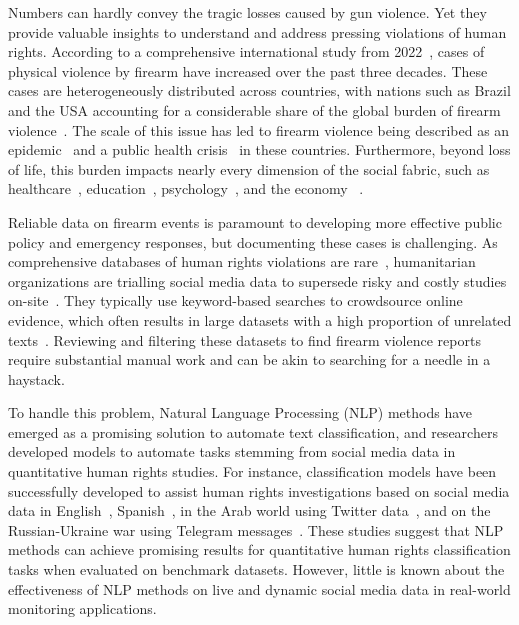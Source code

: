 \documentclass[11pt,letterpaper]{article}
\begin{document}
Numbers can hardly convey the tragic losses caused by gun violence. Yet they provide valuable insights to understand and address pressing violations of human rights. According to a comprehensive international study from 2022~\citep{ouGlobalBurdenTrends2022}, cases of physical violence by firearm have increased over the past three decades. These cases are heterogeneously distributed across countries, with nations such as Brazil and the USA accounting for a considerable share of the global burden of firearm violence~\citep{globalBurden2018,ouGlobalBurdenTrends2022}. The scale of this issue has led to firearm violence being described as an epidemic~\citep{szwarcwaldMortalidadePorArmas1998,kalesanHiddenEpidemicFirearm2017,cavalcantiDinamicasViolenciaUrbana2017,fontanarosaUnrelentingEpidemicFirearm2022} and a public health crisis~\citep{ezeImpactGunViolence2023,silverExaminingHealthcareEconomic2023,generalFirearmViolenceAmerica2024} in these countries. Furthermore, beyond loss of life, this burden impacts nearly every dimension of the social fabric, such as healthcare~\citep{lozovatskyImpactFirearmViolence2014,silvaNoMeioFogo2021}, education~\citep{lemgruberTirosNoFuturo2022}, psychology~\citep{garbarinoMitigatingEffectsGun2002}, and the economy ~\citep{silverExaminingHealthcareEconomic2023,ouGlobalBurdenTrends2022}.

Reliable data on firearm events is paramount to developing more effective public policy and emergency responses, but documenting these cases is challenging. As comprehensive databases of human rights violations are rare~\citep{priceLimitsObservationUnderstanding2015}, humanitarian organizations are trialling social media data to supersede risky and costly studies on-site~\citep{mooneySocialMediaEvidence2021,koliebRespondingHumanRights2018}. They typically use keyword-based searches to crowdsource online evidence, which often results in large datasets with a high proportion of unrelated texts~\citep{myersHowConductDiscovery2020,koenigOpenSourceInvestigations2020}. Reviewing and filtering these datasets to find firearm violence reports require substantial manual work and can be akin to searching for a needle in a haystack.

To handle this problem, Natural Language Processing (NLP) methods have emerged as a promising solution to automate text classification, and researchers developed models to automate tasks stemming from social media data in quantitative human rights studies. For instance, classification models have been successfully developed to assist human rights investigations based on social media data in English~\citep{pilankarDetectingViolationHuman2022}, Spanish~\citep{arellanoOverviewDAVINCISIberLEF2022}, in the Arab world using Twitter data~\citep{alhelbawyNLPPoweredHumanRights2020}, and on the Russian-Ukraine war using Telegram messages~\citep{nemkovaDetectingHumanRights2023}. These studies suggest that NLP methods can achieve promising results for quantitative human rights classification tasks when evaluated on benchmark datasets. However, little is known about the effectiveness of NLP methods on live and dynamic social media data in real-world monitoring applications.
\end{document}
